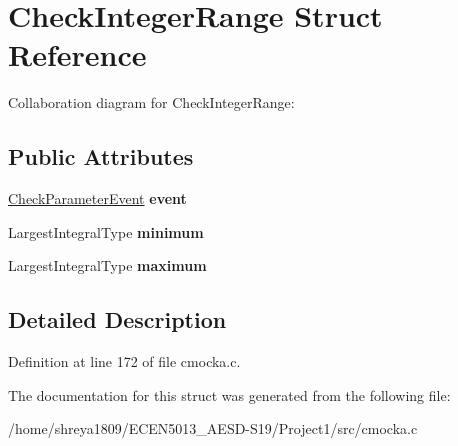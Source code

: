\hypertarget{structCheckIntegerRange}{}\section{Check\+Integer\+Range Struct Reference}
\label{structCheckIntegerRange}


Collaboration diagram for Check\+Integer\+Range\+:
\subsection*{Public Attributes}
\begin{DoxyCompactItemize}
\item 
\mbox{\label{structCheckIntegerRange_a143da2245bf12c28ebc8521e8925d98c}} 
\hyperlink{structCheckParameterEvent}{Check\+Parameter\+Event} {\bfseries event}
\item 
\mbox{\label{structCheckIntegerRange_afcc266d34a957220d9d2a202c67290ff}} 
Largest\+Integral\+Type {\bfseries minimum}
\item 
\mbox{\label{structCheckIntegerRange_a61124c5298a3b1542422125446ef3db1}} 
Largest\+Integral\+Type {\bfseries maximum}
\end{DoxyCompactItemize}


\subsection{Detailed Description}


Definition at line 172 of file cmocka.\+c.



The documentation for this struct was generated from the following file\+:\begin{DoxyCompactItemize}
\item 
/home/shreya1809/\+E\+C\+E\+N5013\+\_\+\+A\+E\+S\+D-\/\+S19/\+Project1/src/cmocka.\+c\end{DoxyCompactItemize}
